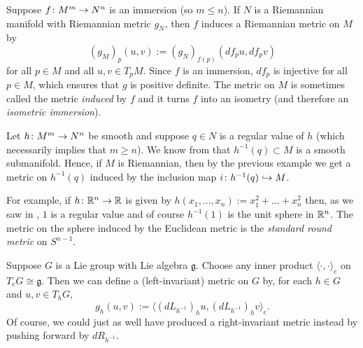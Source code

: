 \begin{example}
	Suppose $f \colon\thinspace\! M^m \to N^n$ is an immersion (so $m \leq n$). If $N$ is a Riemannian manifold with Riemannian metric $g_N$, then $f$ induces a Riemannian metric on $M$ by
	\[
		(g_M)_p(u,v) := (g_N)_{f(p)}(df_p u, df_p v)
	\]
	for all $p \in M$ and all $u,v \in T_pM$. Since $f$ is an immersion, $df_p$ is injective for all $p \in M$, which ensures that $g$ is positive definite. The metric on $M$ is sometimes called the metric \emph{induced} by $f$ and it turns $f$ into an isometry (and therefore an \emph{isometric immersion}).
\end{example}

\begin{example}
	Let $h \colon\thinspace\! M^m \to N^n$ be smooth and suppose $q \in N$ is a regular value of $h$ (which necessarily implies that $m \geq n$). We know from  that $h^{-1}(q) \subset M$ is a smooth submanifold. Hence, if $M$ is Riemannian, then by the previous example we get a metric on $h^{-1}(q)$ induced by the inclusion map $i \colon\thinspace\! h^{-1}(q) \hookrightarrow M$. 
	
	For example, if $h \colon\thinspace\! \mathbb{R}^n \to \mathbb{R}$ is given by $h(x_1, \dots , x_n) := x_1^2 + \dots + x_n^2$ then, as we saw in , $1$ is a regular value and of course $h^{-1}(1)$ is the unit sphere in $\mathbb{R}^n$. The metric on the sphere induced by the Euclidean metric is the \emph{standard round metric} on $S^{n-1}$.
\end{example}

\begin{example}
	Suppose $G$ is a Lie group with Lie algebra $\mathfrak{g}$. Choose any inner product $\langle  \cdot , \cdot \rangle_e$ on $T_e G \cong \mathfrak{g}$. Then we can define a (left-invariant) metric on $G$ by, for each $h \in G$ and $u,v \in T_hG$,
	\[
		g_h(u,v) := \langle \left(dL_{h^{-1}}\right)_h u, \left(dL_{h^{-1}}\right)_h v \rangle_e.
	\]
	Of course, we could just as well have produced a right-invariant metric instead by pushing forward by $dR_{h^{-1}}$.
\end{example}

